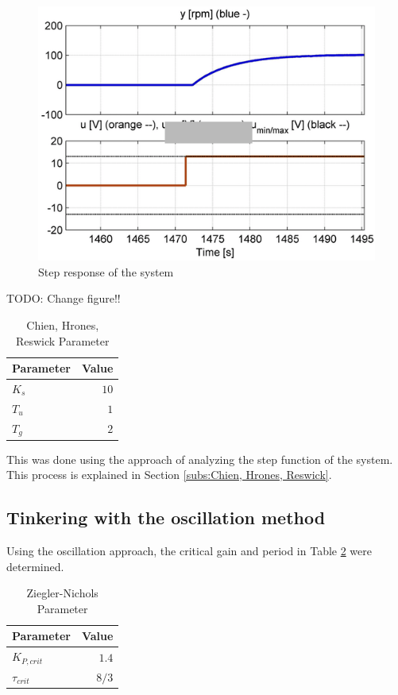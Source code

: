 \begin{figure}[H]
\begin{center}
\includegraphics[width=0.6\linewidth]{images/general/Step_Response}
\end{center}
\caption{Step response of the system}
\label{fig:step_response}
\end{figure}
TODO: Change figure!!

\begin{table}[H]
\begin{center}
\begin{tabular}{ l | r}
  Parameter & Value\\
  \hline
  \hline
  $K_s$ & $10$\\
  \hline
  $T_u$ & $1$\\
  \hline
  $T_g$ & $2$\\
  \hline
\end{tabular}
\end{center}
\caption{Chien, Hrones, Reswick Parameter}
\label{tab:step_params}
\end{table}

This was done using the approach of analyzing the step function of the system. This process is explained in Section \ref{subs:Chien, Hrones, Reswick}.

\subsection{Tinkering with the oscillation method}

Using the oscillation approach, the critical gain and period in Table \ref{tab:osc_params} were determined.

\begin{table}[H]
\begin{center}
\begin{tabular}{ l | r}
  Parameter & Value\\
  \hline
  \hline
  $K_{P,crit}$ & $1.4$\\
  \hline
  $\tau_{crit}$ & $8/3$\\
  \hline
\end{tabular}
\end{center}
\caption{Ziegler-Nichols Parameter}
\label{tab:osc_params}
\end{table}

